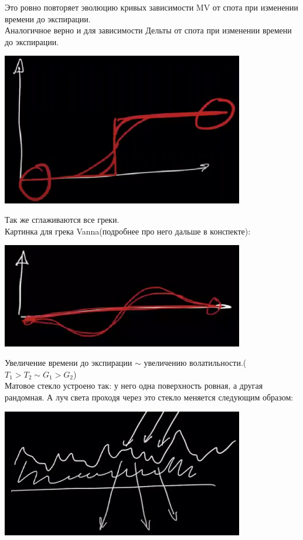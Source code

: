 \documentclass{article}
\begin{document}
Это ровно повторяет эволюцию кривых зависимости MV от спота при изменении времени до экспирации.\\
\newpage
Аналогичное верно и для зависимости Дельты от спота при изменении времени до экспирации.\\
\begin{center}  
\includegraphics[width=300pt]{picture_7.png}\\
\end{center}  

Так же сглаживаются все греки.\\
Картинка для грека Vanna(подробнее про него дальше в конспекте):
\begin{center}  
\includegraphics[width=300pt]{picture_9.png}\\
\end{center}  
Увеличение времени до экспирации $\sim$ увеличению волатильности.($T_1 > T_2 \sim G_1 > G_2$)\\
Матовое стекло устроено так: у него одна поверхность ровная, а другая рандомная. А луч света проходя через это стекло меняется следующим образом:
\begin{center}  
\includegraphics[width=300pt]{picture_8.png}\\
\end{center}  
\newpage
\end{document}
